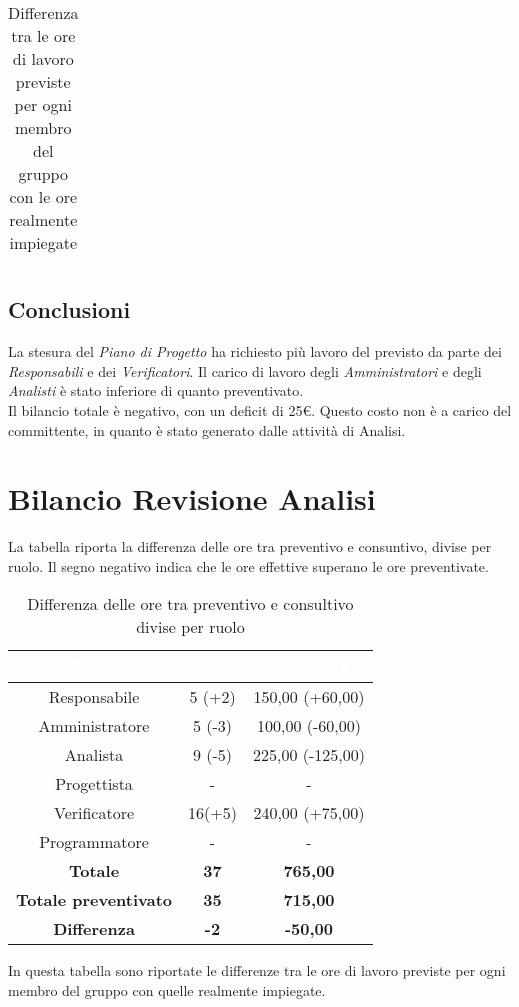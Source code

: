 \begin{flushleft}
\begin{table}[!h]
\begin{center}
\begin{tabularx}{\textwidth}{|c|cccccc|c|}
 		\end{tabularx}
 		\caption{Differenza tra le ore di lavoro previste per ogni membro del gruppo con le ore realmente impiegate }
 		\end{center}
	 \end{table}
    \subsection{Conclusioni}
    La stesura del \textit{Piano di Progetto} ha richiesto più lavoro del previsto da parte dei \textit{Responsabili} e dei \textit{Verificatori}. Il carico di lavoro degli \textit{Amministratori} e degli \textit{Analisti} è stato inferiore di quanto preventivato.\\ Il bilancio totale è negativo, con un deficit di 25\euro. Questo costo non è a carico del committente, in quanto è stato generato dalle attività di Analisi.
    
    \newpage
    
\section{Bilancio Revisione Analisi}\label{BilRevAn}
La tabella riporta la differenza delle ore tra preventivo e consuntivo, divise per ruolo. Il segno negativo indica che le ore effettive superano le ore preventivate.  
  
\begin{table}[!h]
	\begin{center}
		\begin{tabular}{ccc}
			\rowcolor{coolblack}
			\hline
			\textcolor{white}{Ruolo} & \textcolor{white}{Ore} & \textcolor{white}{Costo in \euro}\\
			\hline
			Responsabile   & 5 (+2)  &  150,00 (+60,00) 	\\ 
			Amministratore & 5 (-3)  &  100,00 (-60,00) 	\\ 
			Analista       & 9 (-5)  &  225,00 (-125,00)   	\\ 
			Progettista    & -  	 &  - 					\\ 
			Verificatore   & 16(+5)  &  240,00 (+75,00) 	\\ 
			Programmatore  & -       &  -    		 		\\ \hline
			\textbf{Totale}& \textbf{37} & \textbf{765,00}	\\ \hline 
			\textbf{Totale preventivato}& \textbf{35} & \textbf{715,00}\\ \hline 
			\textbf{Differenza}& \textbf{-2} & \textbf{-50,00 }	\\ \hline  
		\end{tabular}
		\caption{Differenza delle ore tra preventivo e consultivo divise per ruolo} 
	\end{center}
\end{table}
  \clearpage
In questa tabella  sono riportate le differenze tra le ore di lavoro previste per ogni membro del gruppo con quelle realmente impiegate.\\


\end{flushleft}
